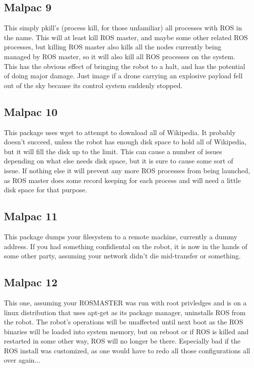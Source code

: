 \documentclass[IEEEtran,letterpaper,10pt,notitlepage,draftclsnofoot,onecolumn]{article}
\begin{document}
\subsection{Malpac 9}
This simply pkill’s (process kill, for those unfamiliar) all processes with ROS in the name.
This will at least kill ROS master, and maybe some other related ROS processes, but killing ROS master also kills all the nodes currently being managed by ROS master, so it will also kill all ROS processes on the system.
This has the obvious effect of bringing the robot to a halt, and has the potential of doing major damage.
Just image if a drone carrying an explosive payload fell out of the sky because its control system suddenly stopped.

\subsection{Malpac 10}
This package uses wget to attempt to download all of Wikipedia.
It probably doesn’t succeed, unless the robot has enough disk space to hold all of Wikipedia, but it will fill the disk up to the limit.
This can cause a number of issues depending on what else needs disk space, but it is sure to cause some sort of issue.
If nothing else it will prevent any more ROS processes from being launched, as ROS master does some record keeping for each process and will need a little disk space for that purpose.

\subsection{Malpac 11}
This package dumps your filesystem to a remote machine, currently a dummy address. If you had something confidiental on the
robot, it is now in the hands of some other party, assuming your network didn't die mid-transfer or something.

\subsection{Malpac 12}
This one, assuming your ROSMASTER was run with root privledges and is on a linux distribution that uses apt-get as its package
manager, uninstalls ROS from the robot. The robot's operations will be unaffected until next boot as the ROS binaries will be 
loaded into system memory, but on reboot or if ROS is killed and restarted in some other way, ROS will no longer be there.
Especially bad if the ROS install was customized, as one would have to redo all those configurations all over again...
\end{document}
